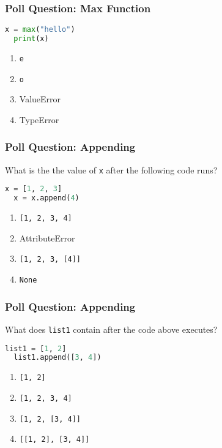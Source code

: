 \documentclass[xcolor=table]{beamer}
\begin{document}
%
%
\begin{frame}[fragile]
  \frametitle{Poll Question: Max Function} 
  \begin{lstlisting}[language=Python, autogobble]
  x = max("hello")
  print(x)
  \end{lstlisting}
  \vfill
  \begin{enumerate}[A] 
    \item \lstinline|e|
    \item \lstinline|o|
    \item ValueError
    \item TypeError
  \end{enumerate}
\end{frame}


%
%
\begin{frame}[fragile]
  \frametitle{Poll Question: Appending}
  What is the the value of \lstinline|x| after the following code runs?
  \begin{lstlisting}[language=Python, autogobble]
  x = [1, 2, 3]
  x = x.append(4)
  \end{lstlisting}
  \vfill
  \begin{enumerate}[A] 
    \item \lstinline|[1, 2, 3, 4]|
    \item AttributeError
    \item \lstinline|[1, 2, 3, [4]]|
    \item \lstinline|None|
  \end{enumerate}
\end{frame}


%
%
\begin{frame}[fragile]
  \frametitle{Poll Question: Appending}
  What does \lstinline|list1| contain after the code above executes?
  \begin{lstlisting}[language=Python, autogobble]
  list1 = [1, 2]
  list1.append([3, 4])
  \end{lstlisting}
  \vfill
  \begin{enumerate}[A] 
    \item \lstinline|[1, 2]|
    \item \lstinline|[1, 2, 3, 4]|
    \item \lstinline|[1, 2, [3, 4]]| %
    \item \lstinline|[[1, 2], [3, 4]]|
  \end{enumerate}
\end{frame}
\end{document}
